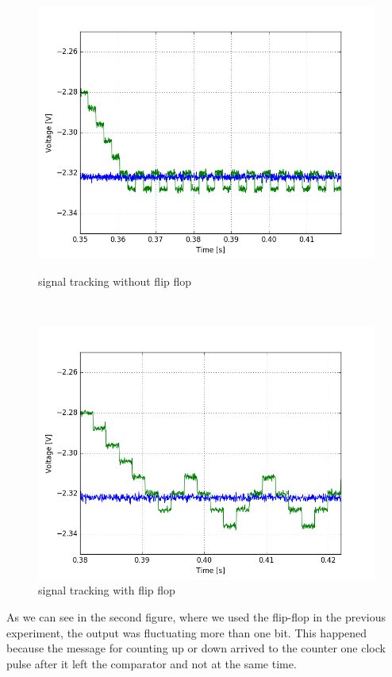 \begin{figure}[H]
\centering
\begin{minipage}{.48\textwidth}
\centering
\includegraphics[width=\textwidth]{12/good.png}
\caption{signal tracking without flip flop}
\end{minipage}\,
\begin{minipage}{.48\textwidth}
\centering
\includegraphics[width=\textwidth]{12/good2.png}
\caption{signal tracking with flip flop}
\end{minipage}
\end{figure}

As we can see in the second figure, where we used the flip-flop in the previous experiment, the output was fluctuating more than one bit. This happened because the message for counting up or down arrived to the counter one clock pulse after it left the comparator and not at the same time.
